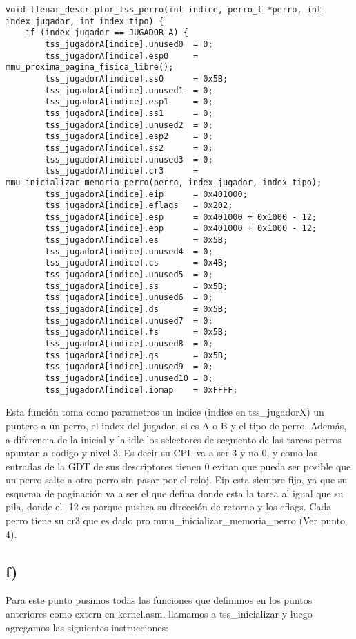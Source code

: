 \begin{codesnippet}
\begin{verbatim}
void llenar_descriptor_tss_perro(int indice, perro_t *perro, int index_jugador, int index_tipo) {
    if (index_jugador == JUGADOR_A) {
        tss_jugadorA[indice].unused0  = 0;
        tss_jugadorA[indice].esp0     = mmu_proxima_pagina_fisica_libre();
        tss_jugadorA[indice].ss0      = 0x5B;
        tss_jugadorA[indice].unused1  = 0;
        tss_jugadorA[indice].esp1     = 0;
        tss_jugadorA[indice].ss1      = 0;
        tss_jugadorA[indice].unused2  = 0;
        tss_jugadorA[indice].esp2     = 0;
        tss_jugadorA[indice].ss2      = 0;
        tss_jugadorA[indice].unused3  = 0;
        tss_jugadorA[indice].cr3      = mmu_inicializar_memoria_perro(perro, index_jugador, index_tipo);
        tss_jugadorA[indice].eip      = 0x401000;
        tss_jugadorA[indice].eflags   = 0x202;
        tss_jugadorA[indice].esp      = 0x401000 + 0x1000 - 12;
        tss_jugadorA[indice].ebp      = 0x401000 + 0x1000 - 12;
        tss_jugadorA[indice].es       = 0x5B;
        tss_jugadorA[indice].unused4  = 0;
        tss_jugadorA[indice].cs       = 0x4B;
        tss_jugadorA[indice].unused5  = 0;
        tss_jugadorA[indice].ss       = 0x5B;
        tss_jugadorA[indice].unused6  = 0;
        tss_jugadorA[indice].ds       = 0x5B;
        tss_jugadorA[indice].unused7  = 0;
        tss_jugadorA[indice].fs       = 0x5B;
        tss_jugadorA[indice].unused8  = 0;
        tss_jugadorA[indice].gs       = 0x5B;
        tss_jugadorA[indice].unused9  = 0;
        tss_jugadorA[indice].unused10 = 0;
        tss_jugadorA[indice].iomap    = 0xFFFF;
 \end{verbatim}
 \end{codesnippet}
Esta función toma como parametros un indice (indice en tss\_jugadorX) un puntero a un perro, el index del jugador, si es A o B y el tipo de perro. Además, a diferencia de la inicial y la idle los selectores de segmento de las tareas perros apuntan a codigo y nivel 3. Es decir su CPL va a ser 3 y no 0, y como las entradas de la GDT de sus descriptores tienen 0  evitan que pueda ser posible que un perro salte a otro perro sin pasar por el reloj. Eip esta siempre fijo, ya que su esquema de paginación va a ser el que defina donde esta la tarea al igual que su pila, donde el -12 es porque pushea su dirección de retorno y los eflags. Cada perro tiene su cr3 que es dado pro  mmu\_inicializar\_memoria\_perro (Ver punto 4). 

\subsection*{f)}
Para este punto pusimos todas las funciones que definimos en los puntos anteriores como extern en kernel.asm, llamamos a tss\_inicializar y luego agregamos las siguientes instrucciones:


